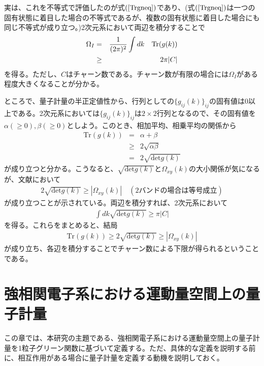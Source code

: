 \documentclass[12pt]{jsbook}
\begin{document}
実は、これを不等式で評価したのが式$(\ref{Trgneq})$であり、(式$(\ref{Trgneq})$は一つの固有状態に着目した場合の不等式であるが、複数の固有状態に着目した場合にも同じ不等式が成り立つ。)2次元系において両辺を積分することで
\begin{eqnarray}
    \Omega_I &=& {1\over (2\pi)^2}\int dk\quad \mathrm{Tr}(g(k))\\
    &\geq& 2\pi |C|
\end{eqnarray}
を得る。ただし、$C$はチャーン数である。チャーン数が有限の場合には$\Omega_I$がある程度大きくなることが分かる。

ところで、量子計量の半正定値性から、行列としての$\{g_{ij}(k)\}_{ij}$の固有値は$0$以上である。2次元系においては$\{g_{ij}(k)\}_{ij}$は$2\times 2$行列となるので、その固有値を$\alpha(\geq 0),\beta(\geq 0)$としよう。このとき、相加平均、相乗平均の関係から
\begin{eqnarray}
    \mathrm{Tr}(g(k))&=&\alpha +\beta\\
    &\geq&2\sqrt{\alpha\beta}\\
    &=&2\sqrt{\mathrm{det}g(k)}
\end{eqnarray}
が成り立つと分かる。こうなると、$\sqrt{\mathrm{det}g(k)}$と$\Omega_{xy}(k)$の大小関係が気になるが、文献\cite{ozawa2021relations}において
\begin{eqnarray}
    2\sqrt{\mathrm{det}g(k)}\geq |\Omega_{xy}(k)| \quad (2バンドの場合は等号成立)
\end{eqnarray}
が成り立つことが示されている。両辺を積分すれば、2次元系において
\begin{eqnarray}
    \int dk \sqrt{\mathrm{det}g(k)}\geq \pi |C|
\end{eqnarray}
を得る。これらをまとめると、結局
\begin{eqnarray}
    \mathrm{Tr}(g(k))\geq 2\sqrt{\mathrm{det}g(k)}\geq |\Omega_{xy}(k)|
\end{eqnarray}
が成り立ち、各辺を積分することでチャーン数による下限が得られるということである。
\chapter{強相関電子系における運動量空間上の量子計量}
この章では、本研究の主題である、強相関電子系における運動量空間上の量子計量を1粒子グリーン関数に基づいて定義する。ただ、具体的な定義を説明する前に、相互作用がある場合に量子計量を定義する動機を説明しておく。
\end{document}
